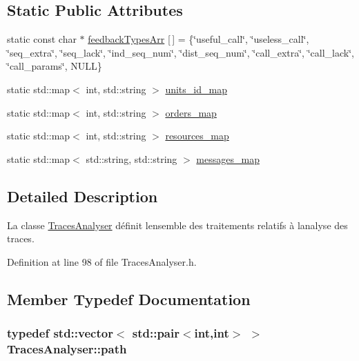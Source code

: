\subsection*{Static Public Attributes}
\begin{DoxyCompactItemize}
\item 
static const char $\ast$ \hyperlink{class_traces_analyser_af1de6c1349fdad93945a0d8079451d22}{feedback\+Types\+Arr} \mbox{[}$\,$\mbox{]} = \{\char`\"{}useful\+\_\+call\char`\"{}, \char`\"{}useless\+\_\+call\char`\"{}, \char`\"{}seq\+\_\+extra\char`\"{}, \char`\"{}seq\+\_\+lack\char`\"{}, \char`\"{}ind\+\_\+seq\+\_\+num\char`\"{}, \char`\"{}dist\+\_\+seq\+\_\+num\char`\"{}, \char`\"{}call\+\_\+extra\char`\"{}, \char`\"{}call\+\_\+lack\char`\"{}, \char`\"{}call\+\_\+params\char`\"{}, N\+U\+LL\}
\item 
static std\+::map$<$ int, std\+::string $>$ \hyperlink{class_traces_analyser_a5e748c4f52e6cbad197b08c7e0273cd8}{units\+\_\+id\+\_\+map}
\item 
static std\+::map$<$ int, std\+::string $>$ \hyperlink{class_traces_analyser_ac37a3052687b9fc98c38e8ca870157be}{orders\+\_\+map}
\item 
static std\+::map$<$ int, std\+::string $>$ \hyperlink{class_traces_analyser_af64ea0a819c3a124563fe7d0ff6e455f}{resources\+\_\+map}
\item 
static std\+::map$<$ std\+::string, std\+::string $>$ \hyperlink{class_traces_analyser_a2addfbe4fff91dcaa53b83163144bf45}{messages\+\_\+map}
\end{DoxyCompactItemize}


\subsection{Detailed Description}
La classe \hyperlink{class_traces_analyser}{Traces\+Analyser} définit l\textquotesingle{}ensemble des traitements relatifs à l\textquotesingle{}analyse des traces. 

Definition at line 98 of file Traces\+Analyser.\+h.



\subsection{Member Typedef Documentation}
\subsubsection[{\texorpdfstring{path}{path}}]{\setlength{\rightskip}{0pt plus 5cm}typedef std\+::vector$<$ std\+::pair$<$int,int$>$ $>$ {\bf Traces\+Analyser\+::path}}\hypertarget{class_traces_analyser_a07dca9f55e9ec0dad64e9bf14d329003}{}\label{class_traces_analyser_a07dca9f55e9ec0dad64e9bf14d329003}


